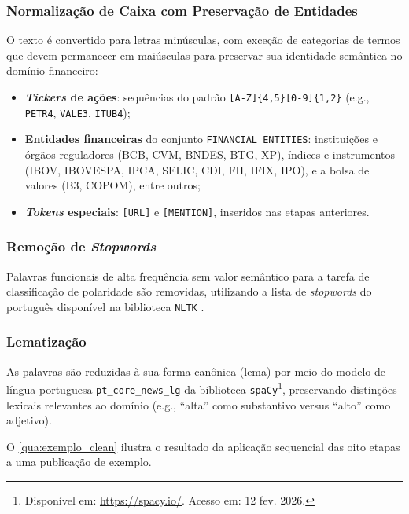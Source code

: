 \subsubsection{Normalização de Caixa com Preservação de Entidades}
\label{subsubsec:caixa}

O texto é convertido para letras minúsculas, com exceção de categorias de termos que devem permanecer em maiúsculas para preservar sua identidade semântica no domínio financeiro:

\begin{itemize}
	\item \textbf{\textit{Tickers} de ações}: sequências do padrão \texttt{[A-Z]\{4,5\}[0-9]\{1,2\}} (e.g., \texttt{PETR4}, \texttt{VALE3}, \texttt{ITUB4});
	
	\item \textbf{Entidades financeiras} do conjunto \texttt{FINANCIAL\_ENTITIES}: instituições e órgãos reguladores (BCB, CVM, BNDES, BTG, XP), 	índices e instrumentos (IBOV, IBOVESPA, IPCA, SELIC, CDI, FII, IFIX, IPO), e a bolsa de valores (B3, COPOM), entre outros;
	
	\item \textbf{\textit{Tokens} especiais}: \texttt{[URL]} e \texttt{[MENTION]}, inseridos nas etapas anteriores.
\end{itemize}

\subsubsection{Remoção de \textit{Stopwords}}
\label{subsubsec:stopwords}

Palavras funcionais de alta frequência sem valor semântico para a tarefa de classificação de polaridade são removidas, utilizando a lista de \textit{stopwords} do português disponível na biblioteca \texttt{NLTK} \cite{jurafsky2026}.

\subsubsection{Lematização}
\label{subsubsec:lematizacao}

As palavras são reduzidas à sua forma canônica (lema) por meio do modelo de língua portuguesa \texttt{pt\_core\_news\_lg} da biblioteca \texttt{spaCy}\footnote{Disponível em: \url{https://spacy.io/}. Acesso em: 12 fev. 2026.}, preservando distinções lexicais relevantes ao domínio (e.g., ``alta'' como substantivo versus ``alto'' como adjetivo).

O \autoref{qua:exemplo_clean} ilustra o resultado da aplicação sequencial das oito etapas a uma publicação de exemplo.

